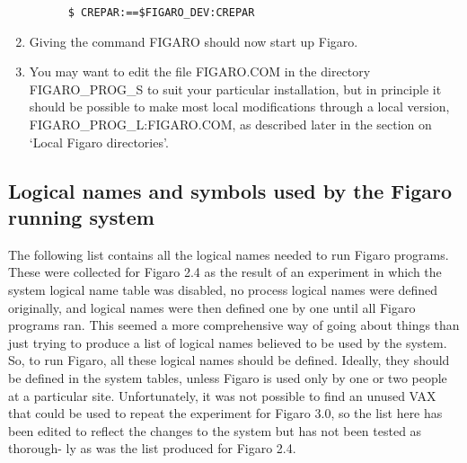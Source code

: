 \begin{enumerate}
\begin{verbatim}
      $ CREPAR:==$FIGARO_DEV:CREPAR
\end{verbatim}

\item Giving the command FIGARO should now start up Figaro.

\item You may want to edit the file  FIGARO.COM  in  the  directory
FIGARO\_PROG\_S  to  suit  your particular installation, but in principle  it 
should  be  possible  to make most local modifications through a local
version, FIGARO\_PROG\_L:FIGARO.COM, as described later in  the  section on
`Local Figaro directories'.

\end{enumerate}
\subsection{Logical names and symbols used by the Figaro running system}

The following list contains all the logical names needed  to  run Figaro
programs.  These were collected for Figaro 2.4 as the result of an experiment
in which the system logical name table was disabled,  no process  logical names
were defined originally, and logical names were then defined one by one until
all Figaro programs ran.  This seemed  a more  comprehensive  way  of  going 
about  things than just trying to produce a list of logical names believed to
be  used  by  the  system. So,  to  run  Figaro,  all  these  logical  names 
should  be defined. Ideally, they should be defined in the system tables,
unless Figaro is used  only  by one or two people at a particular site. 
Unfortunately, it was not possible to find an unused VAX that could be used to
repeat the  experiment  for  Figaro  3.0, so the list here has been edited to
reflect the changes to the system but has not been tested as thorough- ly as
was the list produced for Figaro 2.4.

